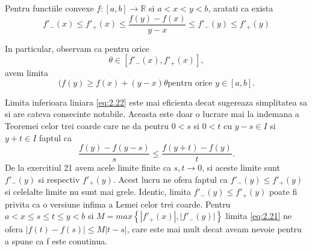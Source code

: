 \documentclass[a4paper,12pt,oneside]{report}
\begin{document}
Pentru functiile convexe \(f : \left [ a,b \right ]  \to \mathbb{R}\) si \(a< x<y< b\), aratati ca exista 
\begin{displaymath}
   {f}'_{-}\left ( x \right ) \leq  {f}'_{+}\left ( x \right ) \leq  \frac{f\left ( y \right ) - f\left ( x \right )}{y - x} \leq  {f}'_{-}\left ( y \right ) \leq  {f}'_{+}\left ( y \right ) \label{eq:2.23} \tag{2.23}
\end{displaymath}

In particular, observam ca pentru orice
\begin{displaymath}
   \theta \in \left [ {f}'_{-}\left ( x \right ), {f}'_{+}\left ( x \right ) \right ],
\end{displaymath}
 avem limita 
 \begin{displaymath}
(f\left ( y \right ) \geq  f\left ( x \right ) + \left ( y - x \right )\theta \text{pentru orice  }y\in \left [ a,b \right ]. \label{eq:2.24} \tag{2.24}
 \end{displaymath}
 
Limita inferioara liniara \ref{eq:2.22} este mai eficienta decat sugereaza simplitatea sa si are cateva consecinte notabile. 
Aceasta este doar o lucrare mai la indemana a Teoremei celor trei coarde care ne da pentru \(0< s\) si \(0< t\) cu \(y - s \in I\) si \(y + t  \in I\) faptul ca 
\begin{displaymath}
   \frac{f\left ( y \right ) - f\left ( y - s \right )}{s}\leq \frac{f\left ( y + t \right ) - f\left ( y \right )}{t}.
\end{displaymath}
 De la exercitiul 21 avem acele limite finite ca \(s,t \to 0\), si aceste limite sunt \({f}'_{-}\left ( y \right )\) si respectiv \({f}'_{+}\left ( y \right )\). Acest lucru ne ofera faptul ca \({f}'_{-}\left ( y \right )\leq {f}'_{+}\left ( y \right )\) si celelalte limite nu sunt mai grele. Identic, limita \({f}'_{-}\left ( y \right )\leq {f}'_{+}\left ( y \right )\) poate fi privita ca o versiune infima a Lemei celor trei coarde. 
Pentru \(a < x \leq s\leq t\leq y<  b\) si \( M = max\left \{ \left | {f}'_{+} \left ( x \right )\right |,\left | {f}'_{-} \left ( y \right )\right |  \right \}\) limita \ref{eq:2.21} ne ofera \(\left | f\left ( t \right ) - f\left ( s \right ) \right |\leq M\left | t - s \right |\), care este mai mult decat aveam nevoie pentru a spune ca f este conutinua. 











\setlength{\baselineskip}{\normalbaselineskip}
\setlength{\parskip}{0pt}

\end{document}
